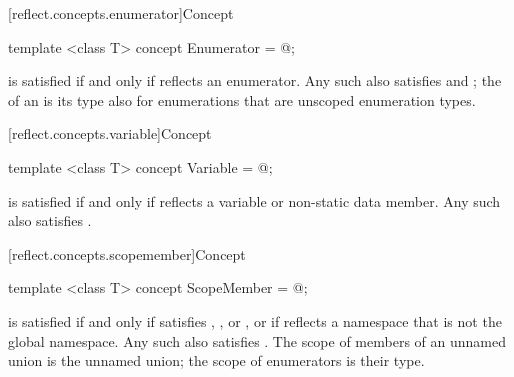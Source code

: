 [reflect.concepts.enumerator]{Concept }

\begin{std.txt}\color{addclr}

\begin{itemdecl}
template <class T> concept Enumerator = @\seebelow@;
\end{itemdecl}

\begin{itemdescr}
\pnum
{} is satisfied if and only if  reflects an enumerator. Any such  also satisfies  and ; the  of an  is its type also for enumerations that are unscoped enumeration types.

\end{itemdescr}
\end{std.txt}

[reflect.concepts.variable]{Concept }

\begin{std.txt}\color{addclr}

\begin{itemdecl}
template <class T> concept Variable = @\seebelow@;
\end{itemdecl}

\begin{itemdescr}
\pnum
{} is satisfied if and only if  reflects a variable or non-static data member. Any such  also satisfies .

\end{itemdescr}
\end{std.txt}

[reflect.concepts.scopemember]{Concept }

\begin{std.txt}\color{addclr}

\begin{itemdecl}
template <class T> concept ScopeMember = @\seebelow@;
\end{itemdecl}

\begin{itemdescr}
\pnum
{} is satisfied if and only if  satisfies , , or , or if  reflects a namespace that is not the global namespace. Any such  also satisfies . The scope of members of an unnamed union is the unnamed union; the scope of enumerators is their type.

\end{itemdescr}
\end{std.txt}


